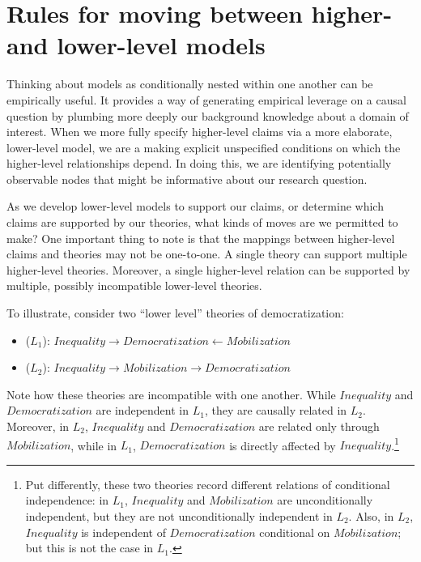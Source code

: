 \documentclass[12pt,]{book}
\providecommand{\tightlist}{%
  \setlength{\itemsep}{0pt}\setlength{\parskip}{0pt}}
\let\rmarkdownfootnote\footnote%
\def\footnote{\protect\rmarkdownfootnote}
\begin{document}
\hypertarget{rules-for-moving-between-higher--and-lower-level-models}{%
\section{Rules for moving between higher- and lower-level models}\label{rules-for-moving-between-higher--and-lower-level-models}}

Thinking about models as conditionally nested within one another can be empirically useful. It provides a way of generating empirical leverage on a causal question by plumbing more deeply our background knowledge about a domain of interest. When we more fully specify higher-level claims via a more elaborate, lower-level model, we are a making explicit unspecified conditions on which the higher-level relationships depend. In doing this, we are identifying potentially observable nodes that might be informative about our research question.

As we develop lower-level models to support our claims, or determine which claims are supported by our theories, what kinds of moves are we permitted to make? One important thing to note is that the mappings between higher-level claims and theories may not be one-to-one. A single theory can support multiple higher-level theories. Moreover, a single higher-level relation can be supported by multiple, possibly incompatible lower-level theories.

To illustrate, consider two ``lower level'' theories of democratization:

\begin{itemize}
\tightlist
\item
  (\(L_1\)): \(Inequality \rightarrow Democratization \leftarrow Mobilization\)\\
\item
  (\(L_2\)): \(Inequality \rightarrow Mobilization \rightarrow Democratization\)
\end{itemize}

Note how these theories are incompatible with one another. While \(Inequality\) and \(Democratization\) are independent in \(L_1\), they are causally related in \(L_2\). Moreover, in \(L_2\), \(Inequality\) and \(Democratization\) are related only through \(Mobilization\), while in \(L_1\), \(Democratization\) is directly affected by \(Inequality\).\footnote{Put differently, these two theories record different relations of conditional independence: in \(L_1\), \(Inequality\) and \(Mobilization\) are unconditionally independent, but they are not unconditionally independent in \(L_2\). Also, in \(L_2\), \(Inequality\) is independent of \(Democratization\) conditional on \(Mobilization\); but this is not the case in \(L_1\).}
\end{document}
